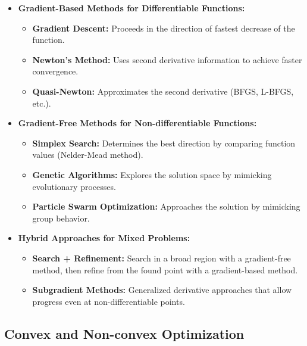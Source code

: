 \begin{tcolorbox}[title=Optimization Methods Based on Differentiability]
\begin{itemize}
    \item \textbf{Gradient-Based Methods for Differentiable Functions:}
    \begin{itemize}
        \item \textbf{Gradient Descent:} Proceeds in the direction of fastest decrease of the function.
        \item \textbf{Newton's Method:} Uses second derivative information to achieve faster convergence.
        \item \textbf{Quasi-Newton:} Approximates the second derivative (BFGS, L-BFGS, etc.).
    \end{itemize}
    
    \item \textbf{Gradient-Free Methods for Non-differentiable Functions:}
    \begin{itemize}
        \item \textbf{Simplex Search:} Determines the best direction by comparing function values (Nelder-Mead method).
        \item \textbf{Genetic Algorithms:} Explores the solution space by mimicking evolutionary processes.
        \item \textbf{Particle Swarm Optimization:} Approaches the solution by mimicking group behavior.
    \end{itemize}
    
    \item \textbf{Hybrid Approaches for Mixed Problems:}
    \begin{itemize}
        \item \textbf{Search + Refinement:} Search in a broad region with a gradient-free method, then refine from the found point with a gradient-based method.
        \item \textbf{Subgradient Methods:} Generalized derivative approaches that allow progress even at non-differentiable points.
    \end{itemize}
\end{itemize}
\end{tcolorbox}

\subsection{Convex and Non-convex Optimization}

